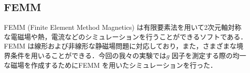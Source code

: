 	\subsection{FEMM}
		FEMM (Finite Element Method Magnetics) は有限要素法を用いて2次元軸対称な電磁場や熱，電流などのシミュレーションを行うことができるソフトである．FEMM は線形および非線形な静磁場問題に対応しており，また，さまざまな境界条件を用いることができる．今回の我々の実験では$g$ 因子を測定する際の均一な磁場を作成するためにFEMM を用いたシミュレーションを行った．


%

